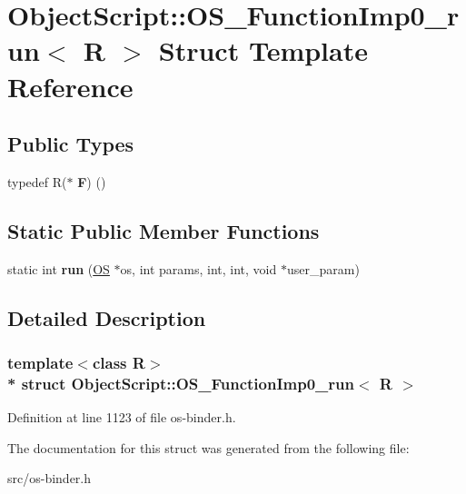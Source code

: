 \hypertarget{struct_object_script_1_1_o_s___function_imp0__run}{}\section{Object\+Script\+:\+:O\+S\+\_\+\+Function\+Imp0\+\_\+run$<$ R $>$ Struct Template Reference}
\label{struct_object_script_1_1_o_s___function_imp0__run}
\subsection*{Public Types}
\begin{DoxyCompactItemize}
\item 
typedef R($\ast$ {\bfseries F}) ()\hypertarget{struct_object_script_1_1_o_s___function_imp0__run_a0e19e49b477194804d5b76f7debb59aa}{}\label{struct_object_script_1_1_o_s___function_imp0__run_a0e19e49b477194804d5b76f7debb59aa}

\end{DoxyCompactItemize}
\subsection*{Static Public Member Functions}
\begin{DoxyCompactItemize}
\item 
static int {\bfseries run} (\hyperlink{class_object_script_1_1_o_s}{OS} $\ast$os, int params, int, int, void $\ast$user\+\_\+param)\hypertarget{struct_object_script_1_1_o_s___function_imp0__run_af4d850a6c7d4cc9629650dcf0b2ce19d}{}\label{struct_object_script_1_1_o_s___function_imp0__run_af4d850a6c7d4cc9629650dcf0b2ce19d}

\end{DoxyCompactItemize}


\subsection{Detailed Description}
\subsubsection*{template$<$class R$>$\\*
struct Object\+Script\+::\+O\+S\+\_\+\+Function\+Imp0\+\_\+run$<$ R $>$}



Definition at line 1123 of file os-\/binder.\+h.



The documentation for this struct was generated from the following file\+:\begin{DoxyCompactItemize}
\item 
src/os-\/binder.\+h\end{DoxyCompactItemize}
